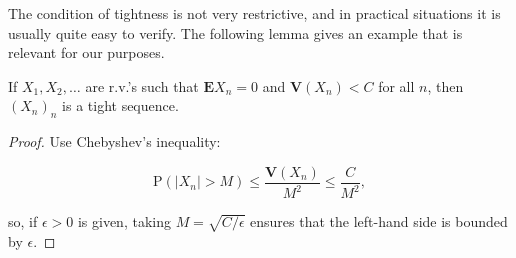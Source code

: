 \noindent The condition of tightness is not very restrictive,
and in practical situations it is usually quite easy
to verify. The following lemma gives an example that
is relevant for our purposes.

\begin{lem}
If $X_1,X_2,\ldots$ are r.v.'s such that
$\mathbf{E} X_n=0$ and $\mathbf{V}(X_n)<C$ for all
$n$, then $(X_n)_n$ is a tight sequence.
\end{lem}

\begin{proof}
Use Chebyshev's inequality:

\[
\mathrm{P}(|X_n|>M) \le \frac{\mathbf{V}(X_n)}{M^2} \le \frac{C}{M^2},
\]

\noindent so, if $\epsilon>0$ is given, taking
$M=\sqrt{C/\epsilon}$ ensures that the left-hand side
is bounded by $\epsilon$.
\end{proof}
